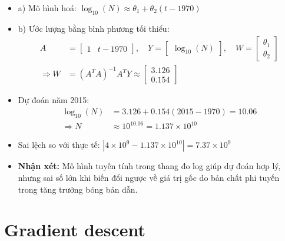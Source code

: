 \documentclass[final,letterpaper,twoside,12pt]{report}
\begin{document}
\begin{itemize}
	\item a) Mô hình hoá: \( \log_{10}(N) \approx \theta_1 + \theta_2(t - 1970) \)
	\item b) Ước lượng bằng bình phương tối thiểu:
	      \begin{align*}
		      A             & = \begin{bmatrix} 1 & t - 1970 \end{bmatrix}, \quad Y = \begin{bmatrix} \log_{10}(N) \end{bmatrix}, \quad W = \begin{bmatrix} \theta_1 \\ \theta_2 \end{bmatrix} \\
		      \Rightarrow W & = (A^TA)^{-1}A^TY \approx \begin{bmatrix} 3.126 \\ 0.154 \end{bmatrix}
	      \end{align*}
	\item Dự đoán năm 2015:
	      \begin{align*}
		      \log_{10}(N)  & = 3.126 + 0.154(2015 - 1970) = 10.06      \\
		      \Rightarrow N & \approx 10^{10.06} = 1.137 \times 10^{10}
	      \end{align*}
	\item Sai lệch so với thực tế: \( \left|4 \times 10^9 - 1.137 \times 10^{10}\right| = 7.37 \times 10^9 \)

	\item \textbf{Nhận xét:} Mô hình tuyến tính trong thang đo log giúp dự đoán hợp lý, nhưng sai số lớn khi biến đổi ngược về giá trị gốc do bản chất phi tuyến trong tăng trưởng bóng bán dẫn.
\end{itemize}


\chapter{Gradient descent}
\end{document}
